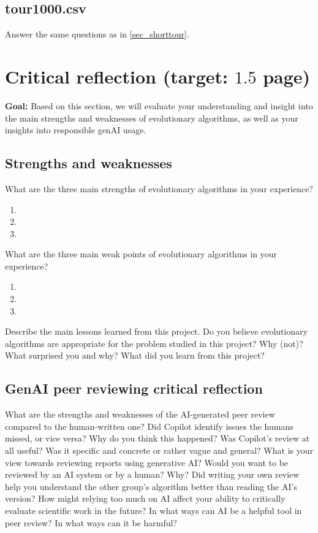 \documentclass[a4paper,10pt]{article}
\newcommand{\ReplaceMe}[1]{{\color{blue}#1}}
\newcommand{\RemoveMe}[1]{{\color{purple}#1}}
\begin{document}
\subsection{tour1000.csv}

\ReplaceMe{Answer the same questions as in \ref{sec_shorttour}.}

\section{Critical reflection \hfill(target: $1.5$ page)}

\RemoveMe{\textbf{Goal:} Based on this section, we will evaluate your understanding and insight into the main strengths and weaknesses of evolutionary algorithms, as well as your insights into responsible genAI usage.}

\subsection{Strengths and weaknesses}
\ReplaceMe{What are the three main strengths of evolutionary algorithms in your experience?}

\begin{enumerate}
 \item 
 \item 
 \item 
\end{enumerate}

\ReplaceMe{What are the three main weak points of evolutionary algorithms in your experience?}

\begin{enumerate}
 \item 
 \item 
 \item 
\end{enumerate}

\ReplaceMe{Describe the main lessons learned from this project. Do you believe evolutionary algorithms are appropriate for the problem studied in this project? Why (not)? What surprised you and why? What did you learn from this project?}

\subsection{GenAI peer reviewing critical reflection} 
\ReplaceMe{What are the strengths and weaknesses of the AI-generated peer review compared to the human-written one? Did Copilot identify issues the humans missed, or vice versa? Why do you think this happened? Was Copilot's review at all useful? Was it specific and concrete or rather vague and general? What is your view towards reviewing reports using generative AI? Would you want to be reviewed by an AI system or by a human? Why? Did writing your own review help you understand the other group's algorithm better than reading the AI’s version? How might relying too much on AI affect your ability to critically evaluate scientific work in the future? In what ways can AI be a helpful tool in peer review? In what ways can it be harmful?}
\end{document}
